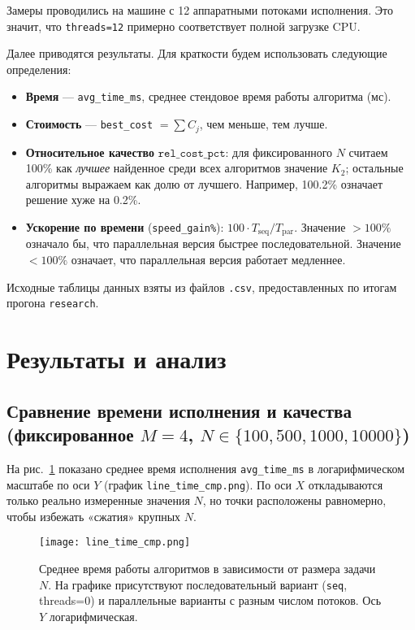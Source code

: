 \documentclass[a4paper,12pt]{article}
\begin{document}
Замеры проводились на машине с 12 аппаратными потоками исполнения. Это значит, что \texttt{threads=12} примерно соответствует полной загрузке CPU.

Далее приводятся результаты. Для краткости будем использовать следующие определения:
\begin{itemize}
    \item \textbf{Время} --- \texttt{avg\_time\_ms}, среднее стендовое время работы алгоритма (мс).
    \item \textbf{Стоимость} --- \texttt{best\_cost} $= \sum C_j$, чем меньше, тем лучше.
    \item \textbf{Относительное качество} \(\texttt{rel\_cost\_pct}\): для фиксированного $N$ считаем 100\% как \emph{лучшее} найденное среди всех алгоритмов значение $K_2$; остальные алгоритмы выражаем как долю от лучшего. Например, 100.2\% означает решение хуже на 0.2\%.
    \item \textbf{Ускорение по времени} (\texttt{speed\_gain\%}): \(\displaystyle 100 \cdot T_{\text{seq}} / T_{\text{par}}\). Значение $>100\%$ означало бы, что параллельная версия быстрее последовательной. Значение $<100\%$ означает, что параллельная версия работает медленнее.
\end{itemize}

\bigskip
Исходные таблицы данных взяты из файлов \texttt{.csv}, предоставленных по итогам прогона \texttt{research}.

\section{Результаты и анализ}

\subsection{Сравнение времени исполнения и качества \\(фиксированное $M=4$, $N \in \{100,500,1000,10000\}$)}

На рис.~\ref{fig:line_time} показано среднее время исполнения \texttt{avg\_time\_ms} в логарифмическом масштабе по оси $Y$ (график \texttt{line\_time\_cmp.png}). По оси $X$ откладываются только реально измеренные значения $N$, но точки расположены равномерно, чтобы избежать «сжатия» крупных $N$.

\begin{figure}[h!]
    \centering
    \texttt{[image: line\_time\_cmp.png]}
    \caption{Среднее время работы алгоритмов в зависимости от размера задачи $N$.
    На графике присутствуют последовательный вариант (\texttt{seq}, threads=0) и параллельные варианты с разным числом потоков.
    Ось $Y$ логарифмическая.}
    \label{fig:line_time}
\end{figure}
\end{document}
